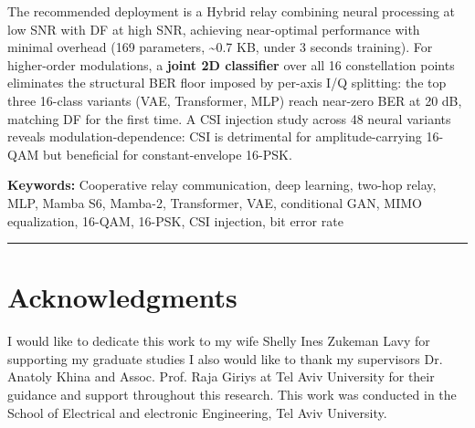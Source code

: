 The recommended deployment is a Hybrid relay combining neural processing at low SNR with DF at high SNR, achieving near-optimal performance with minimal overhead (169 parameters, \textasciitilde0.7 KB, under 3 seconds training). For higher-order modulations, a \textbf{joint 2D classifier} over all 16 constellation points eliminates the structural BER floor imposed by per-axis I/Q splitting: the top three 16-class variants (VAE, Transformer, MLP) reach near-zero BER at 20 dB, matching DF for the first time. A CSI injection study across 48 neural variants reveals modulation-dependence: CSI is detrimental for amplitude-carrying 16-QAM but beneficial for constant-envelope 16-PSK.

\textbf{Keywords:} Cooperative relay communication, deep learning, two-hop relay, MLP, Mamba S6, Mamba-2, Transformer, VAE, conditional GAN, MIMO equalization, 16-QAM, 16-PSK, CSI injection, bit error rate

\begin{center}\rule{0.5\linewidth}{0.5pt}\end{center}


\clearpage

\cleardoublepage
{}
\chapter*{Acknowledgments}

I would like to dedicate this work to my wife Shelly Ines Zukeman Lavy for supporting my graduate studies
I also would like to thank my supervisors Dr. Anatoly Khina and Assoc. Prof.  Raja Giriys at Tel Aviv University for their guidance and support throughout this research. 
This work was conducted in the School of Electrical and electronic Engineering, Tel Aviv University.


